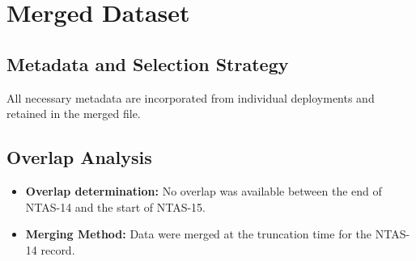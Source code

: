 \documentclass[11pt]{article}
\begin{document}
\section{Merged Dataset}
\subsection{Metadata and Selection Strategy}
All necessary metadata are incorporated from individual deployments and retained in the merged file.

\subsection{Overlap Analysis}
\begin{itemize}
	\item \textbf{Overlap determination:} No overlap was available between the end of NTAS-14 and the start of NTAS-15.
	\item \textbf{Merging Method:} Data were merged at the truncation time for the NTAS-14 record.
\end{itemize}
\end{document}
